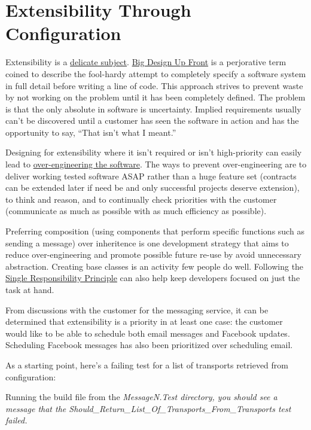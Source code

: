 
\chapter{Extensibility Through Configuration}

Extensibility is a \href{http://webarya.wordpress.com/2010/05/28/my-ten-development-principles/}{delicate subject}. \href{http://c2.com/xp/BigDesignUpFront.html}{Big Design Up Front} is a perjorative term coined to describe the fool-hardy attempt to completely specify a software system in full detail before writing a line of code. This approach strives to prevent waste by not working on the problem until it has been completely defined. The problem is that the only absolute in software is uncertainty. Implied requirements usually can't be discovered until a customer has seen the software in action and has the opportunity to say, ``That isn't what I meant.'' 

Designing for extensibility where it isn't required or isn't high-priority can easily lead to \href{http://blog.digitalstruct.com/2008/02/17/over-engineering-software/}{over-engineering the software}. The ways to prevent over-engineering are to deliver working tested software ASAP rather than a huge feature set (contracts can be extended later if need be and only successful projects deserve extension), to think and reason, and to continually check priorities with the customer (communicate as much as possible with as much efficiency as possible).

Preferring composition (using components that perform specific functions such as sending a message) over inheritence is one development strategy that aims to reduce over-engineering and promote possible future re-use by avoid unnecessary abstraction. Creating base classes is an activity few people do well. Following the \href{http://www.objectmentor.com/resources/articles/srp.pdf}{Single Responsibility Principle} can also help keep developers focused on just the task at hand.

From discussions with the customer for the messaging service, it can be determined that extensibility is a priority in at least one case: the customer would like to be able to schedule both email messages and Facebook updates. Scheduling Facebook messages has also been prioritized over scheduling email.

As a starting point, here's a failing test for a list of transports retrieved from configuration:



Running the build file from the \em MessageN.Test \em directory, you should see a message that the \em Should_Return_List_Of_Transports_From_Transports \em test failed.
